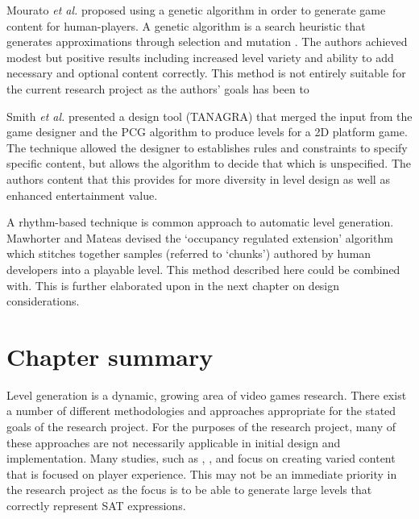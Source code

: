 \documentclass[11pt, a4paper, oneside]{report} %
\begin{document}

Mourato \textit{et al.} \cite{mourato2011automatic} proposed using a genetic
algorithm in order to generate game content for human-players. A genetic
algorithm is a search heuristic that generates approximations through selection
and mutation \cite{srinivas1994genetic}. The authors achieved modest but
positive results including increased level variety and ability to add necessary
and optional content correctly. This method is not entirely suitable for the
current research project as the authors' goals has been to

Smith \textit{et al.} \@\cite{smith2011tanagra} presented a design tool
(TANAGRA) that merged the input from the game designer and the PCG algorithm to
produce levels for a 2D platform game. The technique allowed the designer to
establishes rules and constraints to specify specific content, but allows the
algorithm to decide that which is unspecified. The authors content that this
provides for more diversity in level design as well as enhanced entertainment
value.

A rhythm-based technique is common approach to automatic level generation.
Mawhorter and Mateas \cite{mawhorter2010procedural} devised the `occupancy
regulated extension' algorithm which stitches together samples (referred to
`chunks') authored by human developers into a playable level. This method
described here could be combined with. This is further elaborated upon in the
next chapter on design considerations.

\section{Chapter summary}

Level generation is a dynamic, growing area of video games research. There exist
a number of different methodologies and approaches appropriate for the stated
goals of the research project. For the purposes of the research project, many of
these approaches are not necessarily applicable in initial design and
implementation. Many studies, such as \cite{sorenson2011generic},
\cite{5035629}, and \cite{smith2011tanagra} focus on creating varied content
that is focused on player experience. This may not be an immediate priority in
the research project as the focus is to be able to generate large levels that
correctly represent SAT expressions.
\end{document}
